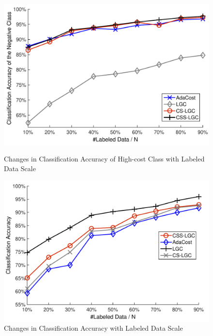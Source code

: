 \documentclass{svjour3}                     %
\begin{document}

\begin{figure}[H]
\begin{minipage}[t]{0.5\linewidth}
\includegraphics[width=\textwidth]{plot/fig7.pdf}
\caption{Changes in Classification Accuracy of High-cost Class with Labeled Data Scale} \label{fig7}
\end{minipage}
\begin{minipage}[t]{0.5\linewidth}
\includegraphics[width=\textwidth]{plot/fig8.pdf}
\caption{Changes in Classification Accuracy with Labeled Data Scale} \label{fig8}
\end{minipage}
\end{figure}
\end{document}

